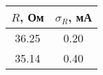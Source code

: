 \begin{tabular}{cc}
\toprule
$R$, Ом & $\sigma_R$, мА \\
\midrule
36.25 & 0.20 \\
35.14 & 0.40 \\
\bottomrule
\end{tabular}
